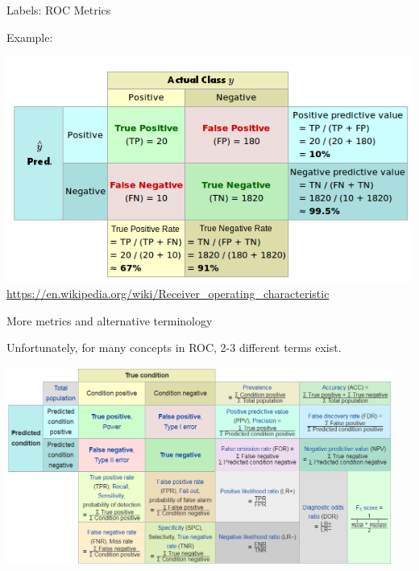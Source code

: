 \documentclass[11pt,compress,t,notes=noshow, xcolor=table]{beamer}
\begin{document}

\begin{vbframe}{Labels: ROC Metrics}

Example:

\begin{center}
  \includegraphics[width=\textwidth]{figure_man/roc-confmatrix-example.png}
  \tiny \url{https://en.wikipedia.org/wiki/Receiver_operating_characteristic}
\end{center}

\end{vbframe}


\begin{vbframe}{More metrics and alternative terminology}

Unfortunately, for many concepts in ROC, 2-3 different terms exist.

\begin{center}
\includegraphics[width=0.95\textwidth]{figure_man/roc-confmatrix-allterms.png}
\end{center}
\href{https://en.wikipedia.org/wiki/F1_score#Diagnostic_testing}{} $\phantom{blablabla}$
\href{https://upload.wikimedia.org/wikipedia/commons/0/0e/DiagnosticTesting_Diagram.svg}{}
\end{vbframe}
\end{document}
